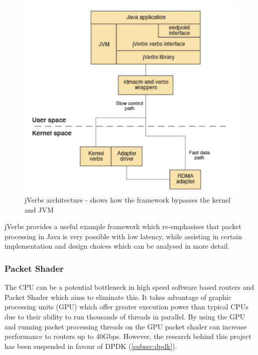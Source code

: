 \documentclass[final_report.tex]{subfiles}
\begin{document}
\begin{figure}[H]
	\centering
	\includegraphics[width=\textwidth]{img/jverbs.png}
	\caption{jVerbs architecture - shows how the framework bypasses the kernel and JVM \cite{ibm_jverbs}}
	\label{fig:jverb}
\end{figure}

jVerbs provides a useful example framework which re-emphasises that packet processing in Java is very possible with low latency, while assisting in certain implementation and design choices which can be analysed in more detail.

\subsubsection{Packet Shader}
The CPU can be a potential bottleneck in high speed software based routers and Packet Shader which aims to eliminate this. It takes advantage of graphic processing units (GPU) which offer greater execution power than typical CPUs due to their ability to run thousands of threads in parallel. By using the GPU and running packet processing threads on the GPU packet shader can increase performance to routers up to 40Gbps. However, the research behind this project has been suspended in favour of DPDK (\ref{subsec:dpdk}).
\end{document}
